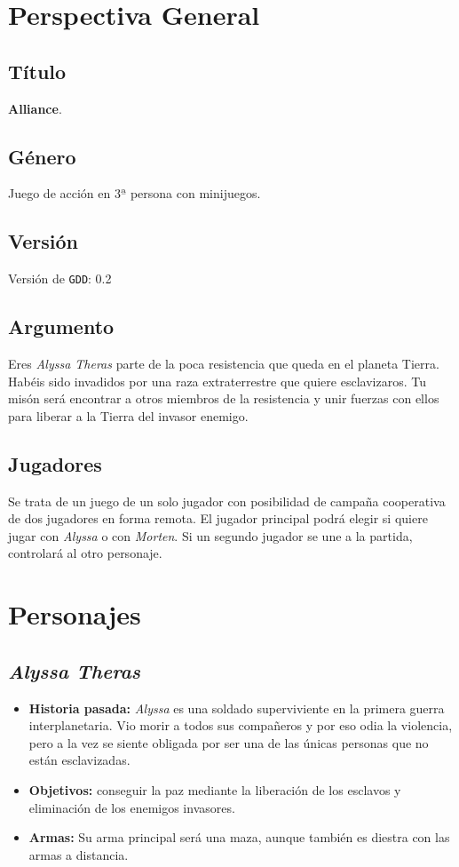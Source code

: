 \documentclass[twoside]{article}
\begin{document}
\pagestyle{insection}
\section{Perspectiva General}

\subsection{Título}
\textbf{Alliance}.

\subsection{Género}
Juego de acción en $3ª$ persona con minijuegos.

\subsection{Versión}
Versión de \texttt{GDD}: 0.2

\subsection{Argumento}
Eres \textit{Alyssa Theras} parte de la poca resistencia que queda en el planeta Tierra. Habéis sido invadidos por una raza extraterrestre que quiere esclavizaros. Tu misón será encontrar a otros miembros de la resistencia y unir fuerzas con ellos para liberar a la Tierra del invasor enemigo. 

\subsection{Jugadores}
Se trata de un juego de un solo jugador con posibilidad de campaña cooperativa de dos jugadores en forma remota. El jugador principal podrá elegir si quiere jugar con \textit{Alyssa} o con \textit{Morten}. Si un segundo jugador se une a la partida, controlará al otro personaje.

\newpage

\pagestyle{insection}
\section{Personajes}

\subsection{\textit{Alyssa Theras}}
\begin{itemize}
\item \textbf{Historia pasada:} \textit{Alyssa} es una soldado superviviente en la primera guerra interplanetaria. Vio morir a todos sus compañeros y por eso odia la violencia, pero a la vez se siente obligada por ser una de las únicas personas que no están esclavizadas. 
\item \textbf{Objetivos:} conseguir la paz mediante la liberación de los esclavos y eliminación de los enemigos invasores.
\item \textbf{Armas:} Su arma principal será una maza, aunque también es diestra con las armas a distancia. 
\end{itemize}
\end{document}
